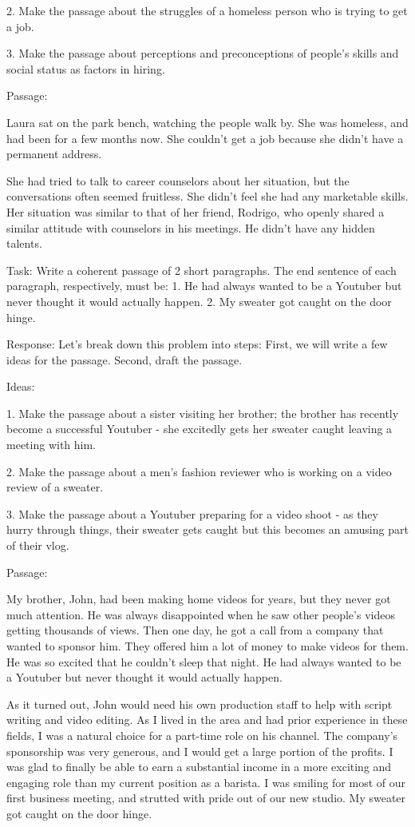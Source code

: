 \documentclass[11pt]{article}
\begin{document}
2. Make the passage about the struggles of a homeless person who is trying to get a job. 

3. Make the passage about perceptions and preconceptions of people's skills and social status as factors in hiring.

Passage: 

Laura sat on the park bench, watching the people walk by. She was homeless, and had been for a few months now. She couldn't get a job because she didn't have a permanent address.

She had tried to talk to career counselors about her situation, but the conversations often seemed fruitless. She didn't feel she had any marketable skills. Her situation was similar to that of her friend, Rodrigo, who openly shared a similar attitude with counselors in his meetings. He didn't have any hidden talents.

Task: Write a coherent passage of 2 short paragraphs. The end sentence of each paragraph, respectively, must be: 1. He had always wanted to be a Youtuber but never thought it would actually happen. 2. My sweater got caught on the door hinge.

Response: Let's break down this problem into steps: First, we will write a few ideas for the passage. Second, draft the passage.

Ideas:

1. Make the passage about a sister visiting her brother; the brother has recently become a successful Youtuber - she excitedly gets her sweater caught leaving a meeting with him.

2. Make the passage about a men's fashion reviewer who is working on a video review of a sweater.

3. Make the passage about a Youtuber preparing for a video shoot - as they hurry through things, their sweater gets caught but this becomes an amusing part of their vlog.

Passage:

My brother, John, had been making home videos for years, but they never got much attention. He was always disappointed when he saw other people's videos getting thousands of views. Then one day, he got a call from a company that wanted to sponsor him. They offered him a lot of money to make videos for them. He was so excited that he couldn't sleep that night. He had always wanted to be a Youtuber but never thought it would actually happen.

As it turned out, John would need his own production staff to help with script writing and video editing. As I lived in the area and had prior experience in these fields, I was a natural choice for a part-time role on his channel. The company's sponsorship was very generous, and I would get a large portion of the profits. I was glad to finally be able to earn a substantial income in a more exciting and engaging role than my current position as a barista. I was smiling for most of our first business meeting, and strutted with pride out of our new studio. My sweater got caught on the door hinge.
\end{document}
